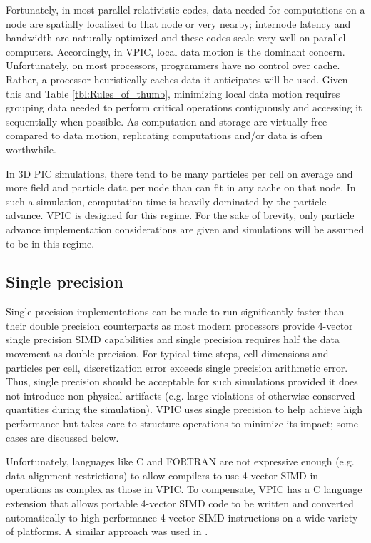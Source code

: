 \documentclass[aps,prl,preprint,preprintnumbers,groupedaddress]{revtex4}
\newcommand{\tbl}[1]{Table \ref{tbl:#1}}
\begin{document}
Fortunately, in most parallel relativistic codes, data needed for
computations on a node are spatially localized to that node or very
nearby; internode latency and bandwidth are naturally optimized and
these codes scale very well on parallel computers.  Accordingly, in
VPIC, local data motion is the dominant concern.  Unfortunately, on
most processors, programmers have no control over cache.  Rather, a
processor heuristically caches data it anticipates will be used.
Given this and \tbl{Rules_of_thumb}, minimizing local data motion
requires grouping data needed to perform critical operations
contiguously and accessing it sequentially when possible.  As
computation and storage are virtually free compared to data motion,
replicating computations and/or data is often worthwhile.

In 3D PIC simulations, there tend to be many particles per cell on
average and more field and particle data per node than can fit in any
cache on that node.  In such a simulation, computation time is heavily
dominated by the particle advance.  VPIC is designed for this regime.
For the sake of brevity, only particle advance implementation
considerations are given and simulations will be assumed to be in this
regime.

\subsection{Single precision}

Single precision implementations can be made to run significantly
faster than their double precision counterparts as most modern
processors provide 4-vector single precision SIMD capabilities and
single precision requires half the data movement as double precision.
For typical time steps, cell dimensions and particles per cell,
discretization error exceeds single precision arithmetic error.  Thus,
single precision should be acceptable for such simulations provided it
does not introduce non-physical artifacts (e.g. large violations of
otherwise conserved quantities during the simulation).  VPIC uses
single precision to help achieve high performance but takes care to
structure operations to minimize its impact; some cases are discussed
below.

Unfortunately, languages like C and FORTRAN are not expressive enough
(e.g. data alignment restrictions) to allow compilers to use 4-vector
SIMD in operations as complex as those in VPIC.  To compensate, VPIC
has a C language extension that allows portable 4-vector SIMD code to
be written and converted automatically to high performance 4-vector
SIMD instructions on a wide variety of platforms.  A similar approach
was used in \cite{Bowers_et_al_2006}.
\end{document}
